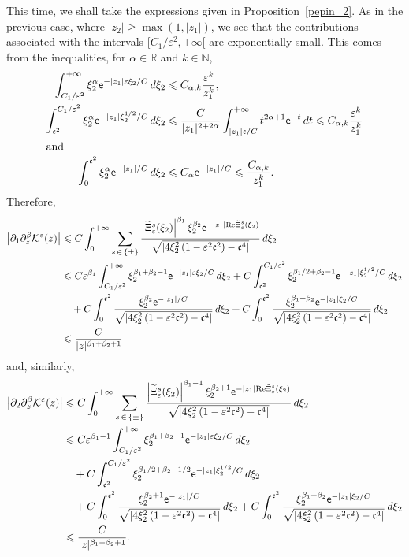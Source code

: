 \documentclass[AHL,Unicode,longabstracts,published]{cedram}
\newcommand*\p{\partial}
\newcommand*\R{\mathbb R}
\newcommand*\N{\mathbb N}
\newcommand{\Rel}{\mathrm{Re}}
\newcommand*\BK{\mathcal{K}}
\newcommand*\ex{{\sf e}}
\newcommand*\cs{{\mathfrak c}}
\newcommand*\ii{\infty}
\newcommand*\gs{\geqslant }
\newcommand*\ls{\leqslant }
\newcommand*\e{\varepsilon}
\renewcommand*\t{\tilde}
\let\oldtilde\tilde
\renewcommand*{\tilde}[1]{\mathchoice{\widetilde{#1}}{\widetilde{#1}}{\oldtilde{#1}}{\oldtilde{#1}}}
\begin{document}
This time, we shall take the expressions given in Proposition~\ref{pepin_2}. As in the previous case, where $ |z_2 | \gs \max(1, |z_1|) $, we see that the contributions associated with the intervals $ [C_1/ \e^2, +\ii [$ are exponentially small. This comes from the inequalities, for $ \alpha \in \R $ and $ k \in \N $,
\begin{align*}
\int_{C_1/\e^2 }^{+\ii} \xi_2^\alpha \ex^{- |z_1| \e \xi_2 / C} \, d\xi_2
&\ls C_{\alpha,k} \frac{\e^k}{z_1^k},
\\
\int_{\cs^2}^{C_1/\e^2 } \xi_2^\alpha \ex^{- |z_1| \xi_2^{1/2} / C} \, d\xi_2
&\ls \frac{C}{|z_1|^{2+2\alpha} } \int_{|z_1| \cs / C }^{+\ii} t^{2\alpha+1} \ex^{- t} \, dt
\ls C_{\alpha,k} \frac{\e^k}{z_1^k}
\\
\intertext{and}
\int_0^{\cs^2} \xi_2^\alpha \ex^{- |z_1| / C} \, d\xi_2
&\ls C_\alpha \ex^{- |z_1| / C}
\ls \frac{C_{\alpha,k} }{z_1^k}.
\end{align*}
Therefore,
\begin{align*}
\left\lvert \p_1 \p_z^\beta \BK^\e (z) \right\rvert &
\ls C \int_{0}^{+\ii} \sum_{s\,\in\,\{ \pm \} }
\frac{\left\lvert \t\Xi_\e^s (\xi_2) \right\rvert^{\beta_1} \xi_2^{\beta_2} \ex^{- |z_1| \Rel \t\Xi_\e^s (\xi_2) } }{ \sqrt{\left \lvert 4 \xi_2^2 \left(1 - \e^2 \cs^2\right) - \cs^4\right\rvert}} \, d\xi_2
\\ &
\ls C \e^{\beta_1} \int_{ C_1 /\e^2 }^{+\ii} \xi_2^{\beta_1 + \beta_2 - 1} \ex^{- |z_1| \e \xi_2 / C} \, d \xi_2 + C \int_{\cs^2}^{ C_1 /\e^2 } \xi_2^{\beta_1 /2 + \beta_2 - 1} \ex^{- |z_1| \xi_2^{1/2} / C} \, d \xi_2
\\ & \quad + C \int_0^{\cs^2} \frac{ \xi_2^{\beta_2} \ex^{- |z_1| / C} }{ \sqrt{ \left\lvert 4 \xi_2^2 \left(1 - \e^2 \cs^2\right) - \cs^4\right\rvert } } \, d\xi_2 + C \int_0^{\cs^2} \frac{ \xi_2^{\beta_1 + \beta_2} \ex^{- |z_1| \xi_2 / C} }{ \sqrt{ \left\lvert 4 \xi_2^2\left(1 - \e^2 \cs^2\right) - \cs^4\right\rvert } } \, d\xi_2
\\ & \ls
\frac{C}{|z|^{\beta_1+\beta_2 +1} }
\end{align*}
and, similarly,
\begin{align*}
\left\lvert \p_2 \p_z^\beta \BK^\e (z)\right\rvert &
\ls C \int_{0}^{+\ii} \sum_{s\,\in\,\{ \pm \} }
\frac{\left\lvert \t\Xi_\e^s (\xi_2) \right\rvert^{\beta_1-1} \xi_2^{\beta_2+1} \ex^{- |z_1| \Rel \t\Xi_\e^s (\xi_2) } }{ \sqrt{ \left\lvert 4 \xi_2^2 \left(1 - \e^2 \cs^2\right) - \cs^4\right\rvert } } \, d\xi_2
\\ &
\ls C \e^{\beta_1-1} \int_{ C_1 /\e^2 }^{+\ii} \xi_2^{\beta_1 + \beta_2 - 1} \ex^{- |z_1| \e \xi_2 / C} \, d \xi_2
\\ & \quad + C \int_{\cs^2}^{ C_1 /\e^2 } \xi_2^{\beta_1 /2 + \beta_2 - 1/2} \ex^{- |z_1| \xi_2^{1/2} / C} \, d \xi_2
\\ & \quad + C \int_0^{\cs^2} \frac{ \xi_2^{\beta_2+1} \ex^{- |z_1| / C} }{ \sqrt{ \left\lvert 4 \xi_2^2 \left(1 - \e^2 \cs^2\right) - \cs^4\right\rvert } } \, d\xi_2 + C \int_0^{\cs^2} \frac{ \xi_2^{\beta_1 + \beta_2} \ex^{- |z_1| \xi_2 / C} }{ \sqrt{ \left\lvert 4 \xi_2^2\left(1 - \e^2 \cs^2\right) - \cs^4 \right\rvert } } \, d\xi_2
\\ & \ls
\frac{C}{|z|^{\beta_1+\beta_2 +1} }.
\end{align*}
\end{document}
